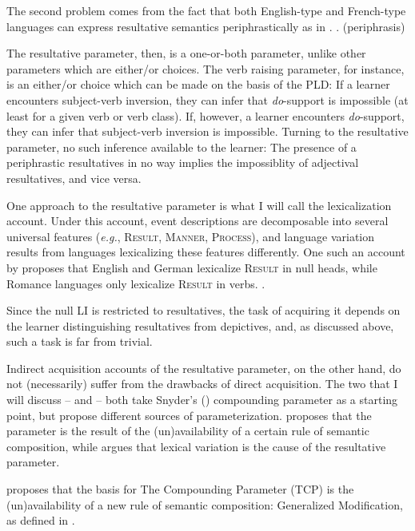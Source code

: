 \documentclass[MilwayThesis]{subfiles}
\begin{document}
The second problem comes from the fact that both English-type and French-type languages can express resultative semantics periphrastically as in \Next.
\ex. (periphrasis)

The resultative parameter, then, is a one-or-both parameter, unlike other parameters which are either/or choices.
The verb raising parameter, for instance, is an either/or choice which can be made on the basis of the PLD:
If a learner encounters subject-verb inversion, they can infer that \textit{do}-support is impossible (at least for a given verb or verb class). 
If, however, a learner encounters \textit{do}-support, they can infer that subject-verb inversion is impossible. 
Turning to the resultative parameter, no such inference available to the learner:
The presence of a periphrastic resultatives in no way implies the impossiblity of adjectival resultatives, and vice versa.

One approach to the resultative parameter is what I will call the lexicalization account.
Under this account, event descriptions are decomposable into several universal features (\textit{e.g.}, \textsc{Result}, \textsc{Manner}, \textsc{Process}), and language variation results from languages lexicalizing these features differently.
One such an account by \textcite{son2008microparameters} proposes that English and German lexicalize \textsc{Result} in null heads, while Romance languages only lexicalize \textsc{Result} in verbs.
\ex.

Since the null LI is restricted to resultatives, the task of acquiring it depends on the learner distinguishing resultatives from depictives, and, as discussed above, such a task is far from trivial.

Indirect acquisition accounts of the resultative parameter, on the other hand, do not (necessarily) suffer from the drawbacks of direct acquisition.
The two that I will discuss -- \textcite{snyder2012parameter} and \textcite{kratzer_building_2004} -- both take Snyder's (\citeyear{snyder1995language}) compounding parameter as a starting point, but propose different sources of parameterization.
\textcite{snyder2012parameter} proposes that the parameter is the result of the (un)availability of a certain rule of semantic composition, while \textcite{kratzer_building_2004} argues that lexical variation is the cause of the resultative parameter.

\textcite{snyder2012parameter} proposes that the basis for The Compounding Parameter (TCP) is the (un)availability of a new rule of semantic composition: Generalized Modification, as defined in \Next.
\end{document}
